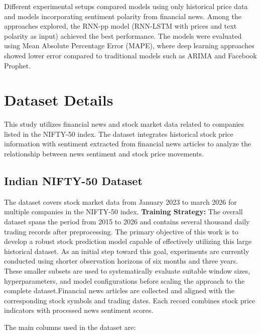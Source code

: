 \documentclass[11pt]{article}
\begin{document}
Different experimental setups compared models using only historical price data and models incorporating sentiment polarity from financial news. Among the approaches explored, the RNN-pp model (RNN-LSTM with prices and text polarity as input) achieved the best performance. The models were evaluated using Mean Absolute Percentage Error (MAPE), where deep learning approaches showed lower error compared to traditional models such as ARIMA and Facebook Prophet.



\section{Dataset Details}

This study utilizes financial news and stock market data related to companies listed in the NIFTY-50 index. The dataset integrates historical stock price information with sentiment extracted from financial news articles to analyze the relationship between news sentiment and stock price movements.

\subsection{Indian NIFTY-50 Dataset}

The dataset covers stock market data from January 2023 to march 2026 for multiple companies in the NIFTY-50 index. \textbf{Training Strategy:} The overall dataset spans the period from 2015 to 2026 and contains several thousand daily trading records after preprocessing. The primary objective of this work is to develop a robust stock prediction model capable of effectively utilizing this large historical dataset. As an initial step toward this goal, experiments are currently conducted using shorter observation horizons of six months and three years. These smaller subsets are used to systematically evaluate suitable window sizes, hyperparameters, and model configurations before scaling the approach to the complete dataset.Financial news articles are collected and aligned with the corresponding stock symbols and trading dates. Each record combines stock price indicators with processed news sentiment scores.

The main columns used in the dataset are:
\end{document}
